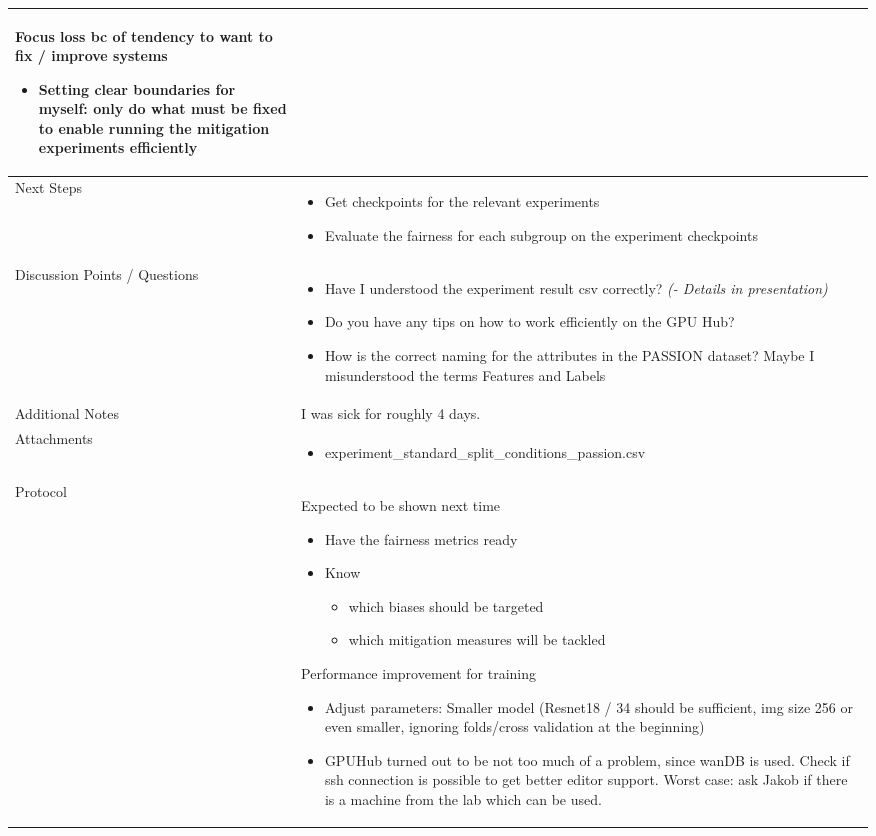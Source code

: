 \documentclass[a4paper,11pt]{article}
\begin{document}
\begin{longtable}{|p{3.5cm}|>{\vspace{-\baselineskip}}p{12cm}|}
	    Focus loss bc of tendency to want to fix / improve systems
		\begin{itemize}
			\item Setting clear boundaries for myself: only do what must be fixed to enable running the mitigation experiments efficiently
		\end{itemize}\\
		
		\hline
		Next Steps & \begin{itemize}[topsep=6pt]
			\item Get checkpoints for the relevant experiments
			\item Evaluate the fairness for each subgroup on the experiment checkpoints
		\end{itemize} \\
		\hline
		Discussion Points / Questions & \begin{itemize}[topsep=6pt]
			\item Have I understood the experiment result csv correctly? \textit{(- Details in presentation)}
			\item Do you have any tips on how to work efficiently on the GPU Hub?
			\item How is the correct naming for the attributes in the PASSION dataset? Maybe I misunderstood the terms Features and Labels 
		\end{itemize} \\
		\hline
		Additional Notes & I was sick for roughly 4 days. \\
		\hline
		Attachments  & \begin{itemize}[topsep=6pt]
			\item experiment\_standard\_split\_conditions\_passion.csv 
		\end{itemize} \\
		\hline
		Protocol  & 
		Expected to be shown next time
		\begin{itemize}
			\item Have the fairness metrics ready
			\item Know
			\begin{itemize}
				\item which biases should be targeted
				\item which mitigation measures will be tackled
			\end{itemize}
		\end{itemize}
		
		
		Performance improvement for training
		\begin{itemize}
			\item Adjust parameters: Smaller model (Resnet18 / 34 should be sufficient, img size 256 or even smaller, ignoring folds/cross validation at the beginning)
			\item GPUHub turned out to be not too much of a problem, since wanDB is used. Check if ssh connection is possible to get better editor support. Worst case: ask Jakob if there is a machine from the lab which can be used.
		\end{itemize}
		

\end{longtable}
\end{document}
